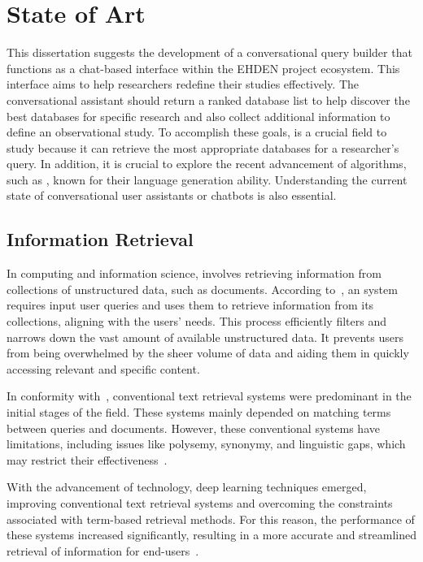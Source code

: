 \chapter{State of Art}
\label{chapter:SA}

This dissertation suggests the development of a conversational query builder that functions as a chat-based interface within the EHDEN project ecosystem. This interface aims to help researchers redefine their studies effectively. The conversational assistant should return a ranked database list to help discover the best databases for specific research and also collect additional information to define an observational study. To accomplish these goals, {\ir} is a crucial field to study because it can retrieve the most appropriate databases for a researcher's query. In addition, it is crucial to explore the recent advancement of algorithms, such as {\llm}, known for their language generation ability. Understanding the current state of conversational user assistants or chatbots is also essential.


\section{Information Retrieval}

In computing and information science, {\ir} involves retrieving information from collections of unstructured data, such as documents. According to~\citet{p_m_efficient_2021}, an {\ir} system requires input user queries and uses them to retrieve information from its collections, aligning with the users' needs. This process efficiently filters and narrows down the vast amount of available unstructured data. It prevents users from being overwhelmed by the sheer volume of data and aiding them in quickly accessing relevant and specific content.

In conformity with~\citet{hambarde_information_2023}, conventional text retrieval systems were predominant in the initial stages of the {\ir} field. These systems mainly depended on matching terms between queries and documents. However, these conventional {\ir} systems have limitations, including issues like polysemy, synonymy, and linguistic gaps, which may restrict their effectiveness~\cite{hambarde_information_2023}.

With the advancement of technology, deep learning techniques emerged, improving conventional text retrieval systems and overcoming the constraints associated with term-based retrieval methods. For this reason, the performance of these systems increased significantly, resulting in a more accurate and streamlined retrieval of information for end-users~\cite{mitra_introduction_nodate}.

